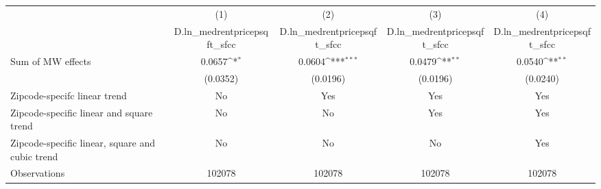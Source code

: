 {
\def\sym#1{\ifmmode^{#1}\else\(^{#1}\)\fi}
\begin{tabular}{l*{4}{c}}
\hline\hline
          &\multicolumn{1}{c}{(1)}&\multicolumn{1}{c}{(2)}&\multicolumn{1}{c}{(3)}&\multicolumn{1}{c}{(4)}\\
          &\multicolumn{1}{c}{D.ln\_medrentpricepsqft\_sfcc}&\multicolumn{1}{c}{D.ln\_medrentpricepsqft\_sfcc}&\multicolumn{1}{c}{D.ln\_medrentpricepsqft\_sfcc}&\multicolumn{1}{c}{D.ln\_medrentpricepsqft\_sfcc}\\
\hline
Sum of MW effects&   0.0657\sym{*}  &   0.0604\sym{***}&   0.0479\sym{**} &   0.0540\sym{**} \\
          & (0.0352)         & (0.0196)         & (0.0196)         & (0.0240)         \\
\hline
Zipcode-specifc linear trend&       No         &      Yes         &      Yes         &      Yes         \\
Zipcode-specific linear and square trend&       No         &       No         &      Yes         &      Yes         \\
Zipcode-specific linear, square and cubic trend&       No         &       No         &       No         &      Yes         \\
Observations&   102078         &   102078         &   102078         &   102078         \\
\hline\hline
\end{tabular}
}
